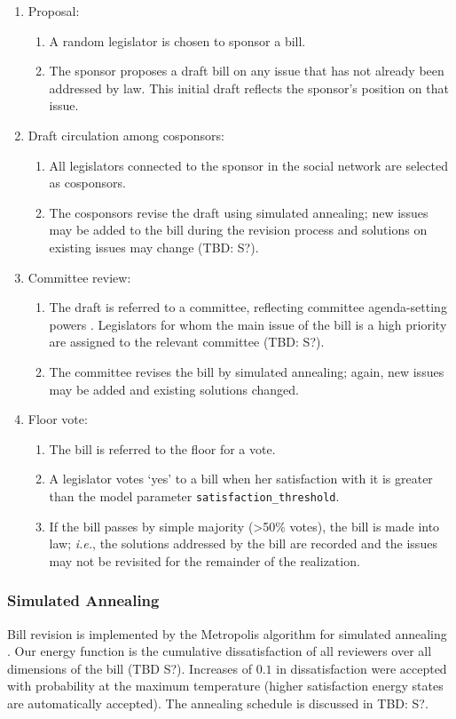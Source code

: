 \documentclass[pdftex,12pt]{llncs}
\begin{document}
\begin{enumerate}
\item Proposal:
\begin{enumerate}
\item A random legislator is chosen to sponsor a bill.
\item The sponsor proposes a draft bill on any issue that has not already been addressed by law.  This initial draft reflects the sponsor's position on that issue.
\end{enumerate}
\item Draft circulation among cosponsors:
\begin{enumerate}
\item All legislators connected to the sponsor in the social network are selected as cosponsors.
\item The cosponsors revise the draft using simulated annealing; new issues may be added to the bill during the revision process and solutions on existing issues may change (TBD: S?).
\end{enumerate}
\item Committee review:
\begin{enumerate}
\item The draft is referred to a committee, reflecting committee agenda-setting powers \parencite{cm93, cm05}.
Legislators for whom the main issue of the bill is a high priority are assigned to the relevant committee (TBD: S?).
\item The committee revises the bill by simulated annealing; again, new issues may be added and existing solutions changed.
\end{enumerate}
\item Floor vote:
\begin{enumerate}
\item The bill is referred to the floor for a vote.
\item A legislator votes `yes' to a bill when her satisfaction with it is greater than the model parameter \texttt{satisfaction\_threshold}.
\item If the bill passes by simple majority (\textgreater 50\% votes), the bill is made into law; \textit{i.e.}, the solutions addressed by the bill are recorded and the issues may not be revisited for the remainder of the realization.
\end{enumerate}
\end{enumerate}

\subsubsection{Simulated Annealing}
Bill revision is implemented by the Metropolis algorithm for simulated annealing \parencite{mrrt53, kgv}.
Our energy function is the cumulative dissatisfaction of all reviewers over all dimensions of the bill (TBD S?).  Increases of $0.1$ in dissatisfaction were accepted with probability  at the maximum temperature (higher satisfaction energy states are automatically accepted).
The annealing schedule is discussed in TBD: S?.
\end{document}
